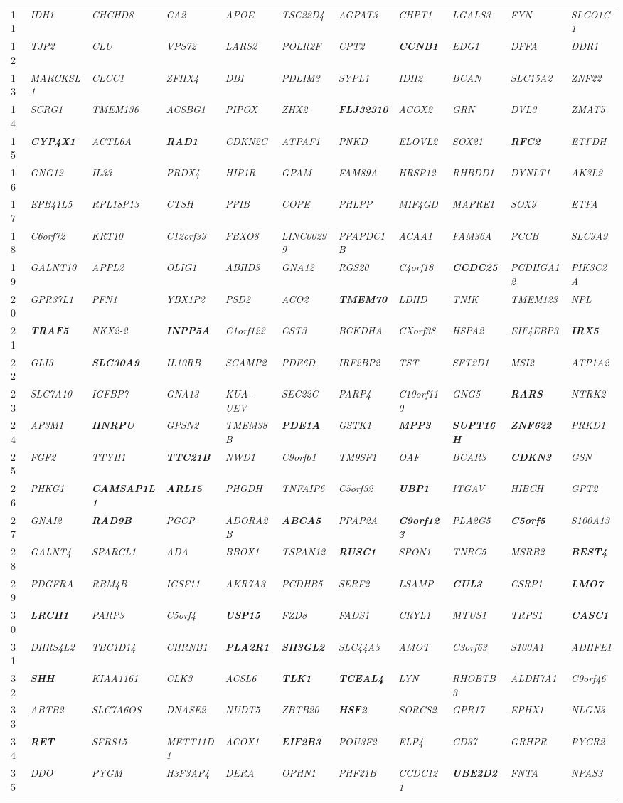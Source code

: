 \documentclass[letterpaper,12pt]{article}
\numberwithin{equation}{appendix}
\begin{document}
\begin{landscape}
{{\begin{longtable}{l >{\itshape}l >{\itshape}l >{\itshape}l >{\itshape}l >{\itshape}l >{\itshape}l >{\itshape}l >{\itshape}l >{\itshape}l >{\itshape}l}
11&IDH1&CHCHD8&CA2&APOE&TSC22D4&AGPAT3&CHPT1&LGALS3&FYN&SLCO1C1\tabularnewline
12&TJP2&CLU&VPS72&LARS2&POLR2F&CPT2&{\bfseries {CCNB1}}&EDG1&DFFA&DDR1\tabularnewline
13&MARCKSL1&CLCC1&ZFHX4&DBI&PDLIM3&SYPL1&IDH2&BCAN&SLC15A2&ZNF22\tabularnewline
14&SCRG1&TMEM136&ACSBG1&PIPOX&ZHX2&{\bfseries {FLJ32310}}&ACOX2&GRN&DVL3&ZMAT5\tabularnewline
15&{\bfseries {CYP4X1}}&ACTL6A&{\bfseries {RAD1}}&CDKN2C&ATPAF1&PNKD&ELOVL2&SOX21&{\bfseries {RFC2}}&ETFDH\tabularnewline
16&GNG12&IL33&PRDX4&HIP1R&GPAM&FAM89A&HRSP12&RHBDD1&DYNLT1&AK3L2\tabularnewline
17&EPB41L5&RPL18P13&CTSH&PPIB&COPE&PHLPP&MIF4GD&MAPRE1&SOX9&ETFA\tabularnewline
18&C6orf72&KRT10&C12orf39&FBXO8&LINC00299&PPAPDC1B&ACAA1&FAM36A&PCCB&SLC9A9\tabularnewline
19&GALNT10&APPL2&OLIG1&ABHD3&GNA12&RGS20&C4orf18&{\bfseries {CCDC25}}&PCDHGA12&PIK3C2A\tabularnewline
20&GPR37L1&PFN1&YBX1P2&PSD2&ACO2&{\bfseries {TMEM70}}&LDHD&TNIK&TMEM123&NPL\tabularnewline
21&{\bfseries {TRAF5}}&NKX2-2&{\bfseries {INPP5A}}&C1orf122&CST3&BCKDHA&CXorf38&HSPA2&EIF4EBP3&{\bfseries {IRX5}}\tabularnewline
22&GLI3&{\bfseries {SLC30A9}}&IL10RB&SCAMP2&PDE6D&IRF2BP2&TST&SFT2D1&MSI2&ATP1A2\tabularnewline
23&SLC7A10&IGFBP7&GNA13&KUA-UEV&SEC22C&PARP4&C10orf110&GNG5&{\bfseries {RARS}}&NTRK2\tabularnewline
24&AP3M1&{\bfseries {HNRPU}}&GPSN2&TMEM38B&{\bfseries {PDE1A}}&GSTK1&{\bfseries {MPP3}}&{\bfseries {SUPT16H}}&{\bfseries {ZNF622}}&PRKD1\tabularnewline
25&FGF2&TTYH1&{\bfseries {TTC21B}}&NWD1&C9orf61&TM9SF1&OAF&BCAR3&{\bfseries {CDKN3}}&GSN\tabularnewline
26&PHKG1&{\bfseries {CAMSAP1L1}}&{\bfseries {ARL15}}&PHGDH&TNFAIP6&C5orf32&{\bfseries {UBP1}}&ITGAV&HIBCH&GPT2\tabularnewline
27&GNAI2&{\bfseries {RAD9B}}&PGCP&ADORA2B&{\bfseries {ABCA5}}&PPAP2A&{\bfseries {C9orf123}}&PLA2G5&{\bfseries {C5orf5}}&S100A13\tabularnewline
28&GALNT4&SPARCL1&ADA&BBOX1&TSPAN12&{\bfseries {RUSC1}}&SPON1&TNRC5&MSRB2&{\bfseries {BEST4}}\tabularnewline
29&PDGFRA&RBM4B&IGSF11&AKR7A3&PCDHB5&SERF2&LSAMP&{\bfseries {CUL3}}&CSRP1&{\bfseries {LMO7}}\tabularnewline
30&{\bfseries {LRCH1}}&PARP3&C5orf4&{\bfseries {USP15}}&FZD8&FADS1&CRYL1&MTUS1&TRPS1&{\bfseries {CASC1}}\tabularnewline
31&DHRS4L2&TBC1D14&CHRNB1&{\bfseries {PLA2R1}}&{\bfseries {SH3GL2}}&SLC44A3&AMOT&C3orf63&S100A1&ADHFE1\tabularnewline
32&{\bfseries {SHH}}&KIAA1161&CLK3&ACSL6&{\bfseries {TLK1}}&{\bfseries {TCEAL4}}&LYN&RHOBTB3&ALDH7A1&C9orf46\tabularnewline
33&ABTB2&SLC7A6OS&DNASE2&NUDT5&ZBTB20&{\bfseries {HSF2}}&SORCS2&GPR17&EPHX1&NLGN3\tabularnewline
34&{\bfseries {RET}}&SFRS15&METT11D1&ACOX1&{\bfseries {EIF2B3}}&POU3F2&ELP4&CD37&GRHPR&PYCR2\tabularnewline
35&DDO&PYGM&H3F3AP4&DERA&OPHN1&PHF21B&CCDC121&{\bfseries {UBE2D2}}&FNTA&NPAS3\tabularnewline

\end{longtable}}}
\end{landscape}
\end{document}

